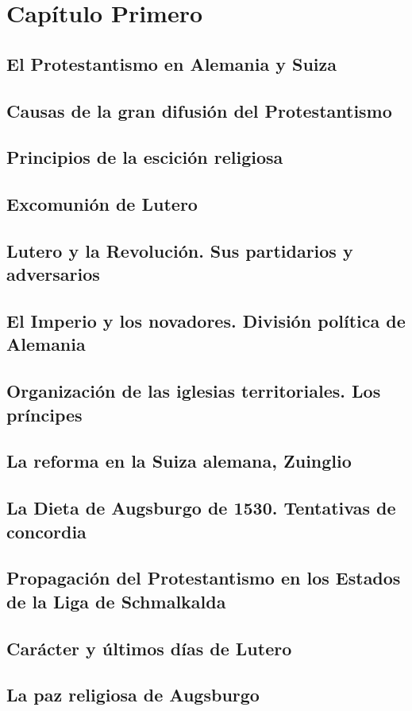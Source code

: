\raggedbottom{} \documentclass[12pt, a4paper]{book}
\begin{document}
\chapter{Capítulo Primero}
\section{El Protestantismo en Alemania y Suiza}
\section{Causas de la gran difusión del Protestantismo}
\section{Principios de la escición religiosa}
\section{Excomunión de Lutero}
\section{Lutero y la Revolución. Sus partidarios y adversarios}
\section{El Imperio y los novadores. División política de Alemania}
\section{Organización de las iglesias territoriales. Los príncipes}
\section{La reforma en la Suiza alemana, Zuinglio}
\section{La Dieta de Augsburgo de 1530. Tentativas de concordia}
\section{Propagación del Protestantismo en los Estados de la Liga de Schmalkalda}
\section{Carácter y últimos días de Lutero}
\section{La paz religiosa de Augsburgo}
\end{document}
